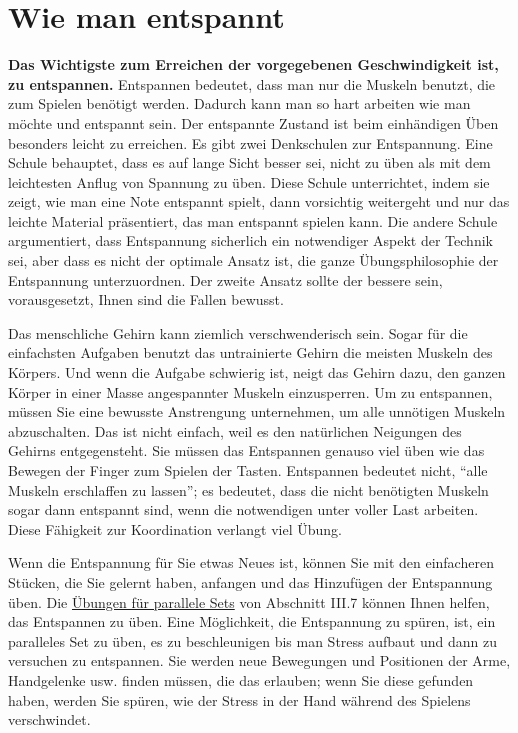 \section{Wie man entspannt}
\label{c1ii14}

\textbf{Das Wichtigste zum Erreichen der vorgegebenen Geschwindigkeit ist, zu entspannen.}
Entspannen bedeutet, dass man nur die Muskeln benutzt, die zum Spielen benötigt werden.
Dadurch kann man so hart arbeiten wie man möchte und entspannt sein.
Der entspannte Zustand ist beim einhändigen Üben besonders leicht zu erreichen.
Es gibt zwei Denkschulen zur Entspannung.
Eine Schule behauptet, dass es auf lange Sicht besser sei, nicht zu üben als mit dem leichtesten Anflug von Spannung zu üben.
Diese Schule unterrichtet, indem sie zeigt, wie man eine Note entspannt spielt, dann vorsichtig weitergeht und nur das leichte Material präsentiert, das man entspannt spielen kann.
Die andere Schule argumentiert, dass Entspannung sicherlich ein notwendiger Aspekt der Technik sei, aber dass es nicht der optimale Ansatz ist, die ganze Übungsphilosophie der Entspannung unterzuordnen.
Der zweite Ansatz sollte der bessere sein, vorausgesetzt, Ihnen sind die Fallen bewusst.

Das menschliche Gehirn kann ziemlich verschwenderisch sein.
Sogar für die einfachsten Aufgaben benutzt das untrainierte Gehirn die meisten Muskeln des Körpers.
Und wenn die Aufgabe schwierig ist, neigt das Gehirn dazu, den ganzen Körper in einer Masse angespannter Muskeln einzusperren.
Um zu entspannen, müssen Sie eine bewusste Anstrengung unternehmen, um alle unnötigen Muskeln abzuschalten.
Das ist nicht einfach, weil es den natürlichen Neigungen des Gehirns entgegensteht.
Sie müssen das Entspannen genauso viel üben wie das Bewegen der Finger zum Spielen der Tasten.
Entspannen bedeutet nicht, \enquote{alle Muskeln erschlaffen zu lassen}; es bedeutet, dass die nicht benötigten Muskeln sogar dann entspannt sind, wenn die notwendigen unter voller Last arbeiten.
Diese Fähigkeit zur Koordination verlangt viel Übung.

Wenn die Entspannung für Sie etwas Neues ist, können Sie mit den einfacheren Stücken, die Sie gelernt haben, anfangen und das Hinzufügen der Entspannung üben.
Die \hyperref[c1iii7b]{Übungen für parallele Sets} von Abschnitt III.7 können Ihnen helfen, das Entspannen zu üben.
Eine Möglichkeit, die Entspannung zu spüren, ist, ein paralleles Set zu üben, es zu beschleunigen bis man Stress aufbaut und dann zu versuchen zu entspannen.
Sie werden neue Bewegungen und Positionen der Arme, Handgelenke usw. finden müssen, die das erlauben; wenn Sie diese gefunden haben, werden Sie spüren, wie der Stress in der Hand während des Spielens verschwindet.

